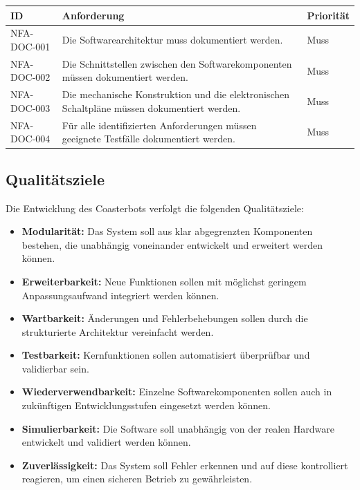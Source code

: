 \begin{longtable}[]{@{}
  >{\raggedright\arraybackslash}p{}
  >{\raggedright\arraybackslash}p{}
  >{\raggedright\arraybackslash}p{}@{}}
\toprule\noalign{}
\begin{minipage}[b]{\linewidth}\raggedright
ID
\end{minipage} & \begin{minipage}[b]{\linewidth}\raggedright
Anforderung
\end{minipage} & \begin{minipage}[b]{\linewidth}\raggedright
Priorität
\end{minipage} \\
\midrule\noalign{}
\endhead
\bottomrule\noalign{}
\endlastfoot
NFA-DOC-001 & Die Softwarearchitektur muss dokumentiert werden. &
Muss \\
NFA-DOC-002 & Die Schnittstellen zwischen den Softwarekomponenten müssen
dokumentiert werden. & Muss \\
NFA-DOC-003 & Die mechanische Konstruktion und die elektronischen
Schaltpläne müssen dokumentiert werden. & Muss \\
NFA-DOC-004 & Für alle identifizierten Anforderungen müssen geeignete
Testfälle dokumentiert werden. & Muss \\
\end{longtable}

\subsection{Qualitätsziele}\label{qualituxe4tsziele}

Die Entwicklung des Coasterbots verfolgt die folgenden Qualitätsziele:

\begin{itemize}
\tightlist
\item
  \textbf{Modularität:} Das System soll aus klar abgegrenzten
  Komponenten bestehen, die unabhängig voneinander entwickelt und
  erweitert werden können.
\item
  \textbf{Erweiterbarkeit:} Neue Funktionen sollen mit möglichst
  geringem Anpassungsaufwand integriert werden können.
\item
  \textbf{Wartbarkeit:} Änderungen und Fehlerbehebungen sollen durch die
  strukturierte Architektur vereinfacht werden.
\item
  \textbf{Testbarkeit:} Kernfunktionen sollen automatisiert überprüfbar
  und validierbar sein.
\item
  \textbf{Wiederverwendbarkeit:} Einzelne Softwarekomponenten sollen
  auch in zukünftigen Entwicklungsstufen eingesetzt werden können.
\item
  \textbf{Simulierbarkeit:} Die Software soll unabhängig von der realen
  Hardware entwickelt und validiert werden können.
\item
  \textbf{Zuverlässigkeit:} Das System soll Fehler erkennen und auf
  diese kontrolliert reagieren, um einen sicheren Betrieb zu
  gewährleisten.
\end{itemize}

